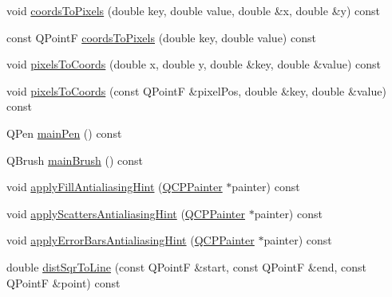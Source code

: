 \begin{DoxyCompactItemize}
\item 
void \hyperlink{class_q_c_p_abstract_plottable_ade710a776104b14c1c835168ce1bfc5c}{coords\-To\-Pixels} (double key, double value, double \&x, double \&y) const 
\item 
const Q\-Point\-F \hyperlink{class_q_c_p_abstract_plottable_a9fd1c9df8391781f05b0be22fbe91e13}{coords\-To\-Pixels} (double key, double value) const 
\item 
void \hyperlink{class_q_c_p_abstract_plottable_a10408828446e9e0681c46d65120f382e}{pixels\-To\-Coords} (double x, double y, double \&key, double \&value) const 
\item 
void \hyperlink{class_q_c_p_abstract_plottable_a3e2c361cfcdfd5d803ada4d333a07e15}{pixels\-To\-Coords} (const Q\-Point\-F \&pixel\-Pos, double \&key, double \&value) const 
\item 
Q\-Pen \hyperlink{class_q_c_p_abstract_plottable_a19276ed2382a3a06464417b8788b1451}{main\-Pen} () const 
\item 
Q\-Brush \hyperlink{class_q_c_p_abstract_plottable_ae74c123832da180c17e22203e748d9b7}{main\-Brush} () const 
\item 
void \hyperlink{class_q_c_p_abstract_plottable_ac08a480155895e674dbfe5a5670e0ff3}{apply\-Fill\-Antialiasing\-Hint} (\hyperlink{class_q_c_p_painter}{Q\-C\-P\-Painter} $\ast$painter) const 
\item 
void \hyperlink{class_q_c_p_abstract_plottable_a753272ee225a62827e90c3e1e78de4b1}{apply\-Scatters\-Antialiasing\-Hint} (\hyperlink{class_q_c_p_painter}{Q\-C\-P\-Painter} $\ast$painter) const 
\item 
void \hyperlink{class_q_c_p_abstract_plottable_af687bfe6160255960558eb71f1f81e73}{apply\-Error\-Bars\-Antialiasing\-Hint} (\hyperlink{class_q_c_p_painter}{Q\-C\-P\-Painter} $\ast$painter) const 
\item 
double \hyperlink{class_q_c_p_abstract_plottable_a5ea1cab44ca912dcdc96ed81ec5bed5d}{dist\-Sqr\-To\-Line} (const Q\-Point\-F \&start, const Q\-Point\-F \&end, const Q\-Point\-F \&point) const 
\end{DoxyCompactItemize}
